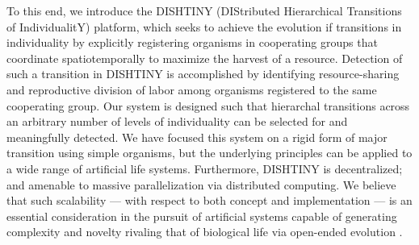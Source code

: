 To this end, we introduce the DISHTINY (DIStributed Hierarchical Transitions of IndividualitY) platform, which seeks to achieve the evolution if transitions in individuality by explicitly registering organisms in cooperating groups that coordinate spatiotemporally to maximize the harvest of a resource.
Detection of such a transition in DISHTINY is accomplished by identifying resource-sharing and reproductive division of labor among organisms registered to the same cooperating group.
Our system is designed such that hierarchal transitions across an arbitrary number of levels of individuality can be selected for and meaningfully detected.
We have focused this system on a rigid form of major transition using simple organisms, but the underlying principles %
can be applied to a wide range of artificial life systems.
Furthermore, DISHTINY is decentralized;
and amenable to massive parallelization via distributed computing.
We believe that such scalability --- with respect to both concept and implementation --- is an essential consideration in the pursuit of artificial systems capable of generating complexity and novelty rivaling that of biological life via open-ended evolution \citep{ackley2011pursue, ackley2016indefinite}.

